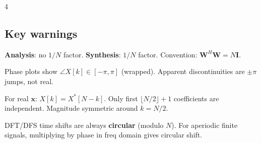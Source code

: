 \documentclass[8pt,a4paper,landscape]{extarticle}
\begin{document}
\begin{multicols*}{4}
\subsection{Key warnings}
\begin{warn}[title=DFT normalization]
\textbf{Analysis}: no $1/N$ factor. \textbf{Synthesis}: $1/N$ factor. Convention: $\mathbf{W}^H\mathbf{W}=N\mathbf{I}$.
\end{warn}

\begin{warn}[title=Phase wrapping]
Phase plots show $\angle X[k] \in [-\pi,\pi]$ (wrapped). Apparent discontinuities are $\pm\pi$ jumps, not real.
\end{warn}

\begin{warn}[title=Real signal DFT]
For real $\mathbf{x}$: $X[k]=X^*[N-k]$. Only first $\lfloor N/2\rfloor+1$ coefficients are independent. Magnitude symmetric around $k=N/2$.
\end{warn}

\begin{warn}[title=Circular vs.\ linear shift]
DFT/DFS time shifts are always \textbf{circular} (modulo $N$). For aperiodic finite signals, multiplying by phase in freq domain gives circular shift.
\end{warn}

\end{multicols*}
\end{document}
